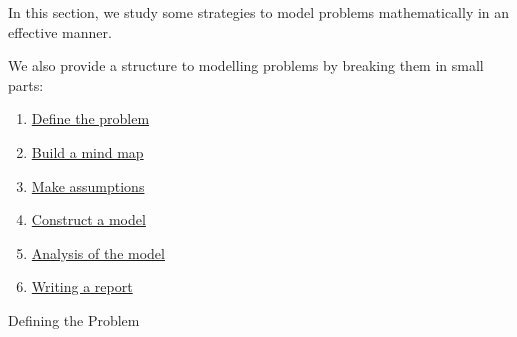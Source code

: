 
%
%


\begin{topic}


In this section, we study some strategies to model problems mathematically in an effective manner.

We also provide a structure to modelling problems by breaking them in small parts:

\begin{enumerate}[label={\bf \arabic*.}]
	\item \hyperref[define]{Define the problem}
	\item \hyperref[mindmap]{Build a mind map}
	\item \hyperref[assumption]{Make assumptions}
	\item \hyperref[model]{Construct a model}
	\item \hyperref[analysis]{Analysis of the model}
	\item \hyperref[report]{Writing a report}
\end{enumerate}



\end{topic}

\begin{module}{Defining the Problem}
	\label{define}

	
	
\end{module}


